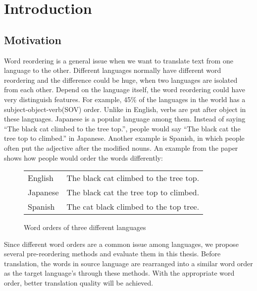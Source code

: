 
\chapter{Introduction}
\label{ch:Introduction}

\section{Motivation}
\label{ch:Introduction:sec:Motivation}

Word reordering is a general issue when we want to translate text from one language to the other. Different languages normally have different word reordering and the difference could be huge, when two languages are isolated from each other. Depend on the language itself, the word reordering could have very distinguish features. For example, 45\% of the languages in the world has a subject-object-verb(SOV) order. Unlike in English, verbs are put after object in these languages. Japanese is a popular language among them. Instead of saying ``The black cat climbed to the tree top.'', people would say ``The black cat the tree top to climbed.'' in Japanese. Another example is Spanish, in which people often put the adjective after the modified nouns. An example from the paper \cite{google} shows how people would order the words differently:

\begin{figure}[H]
\centering
\begin{tabular}{ll}

English & The black cat climbed to the tree top. \\
Japanese & The black cat the tree top to climbed. \\
Spanish & The cat black climbed to the top tree. \\

\end{tabular}
\caption{Word orders of three different languages}
\end{figure}

Since different word orders are a common issue among languages, we propose several pre-reordering methods and evaluate them in this thesis. Before translation, the words in source language are rearranged into a similar word order as the target language's through these methods. With the appropriate word order, better translation quality will be achieved.

